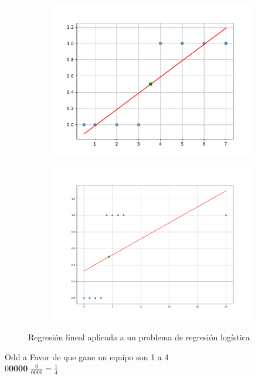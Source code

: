 \documentclass{report}
\begin{document}
\begin{figure}[h]
	\begin{subfigure}{0.5\textwidth}
	\includegraphics[scale=0.5]{img/RL1}
	\caption{}
	\label{Fig:RL1}
	\end{subfigure}
	\begin{subfigure}{0.5\textwidth}
		\includegraphics[scale=0.3]{img/RL2}
		\caption{}
		\label{Fig:RL2}
	\end{subfigure}
\caption{Regresión lineal aplicada a un problema de regresión logística}
\label{Fig:RL}
\end{figure}	Odd a Favor de que gane un equipo son 1 a 4\\
0\textbf{0000} $ \frac{0}{0000}=\frac{1}{4} $\\
\end{document}
